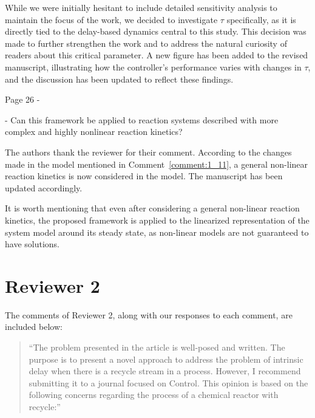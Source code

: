 \documentclass[11pt,answers]{exam}
\begin{document}
\begin{questions}
\begin{solutionorbox}
        While we were initially hesitant to include detailed sensitivity analysis to maintain the focus of the work, we decided to investigate \(\tau\) specifically, as it is directly tied to the delay-based dynamics central to this study. This decision was made to further strengthen the work and to address the natural curiosity of readers about this critical parameter. A new figure has been added to the revised manuscript, illustrating how the controller’s performance varies with changes in \(\tau\), and the discussion has been updated to reflect these findings. 
    \end{solutionorbox}


    \question Page 26 - 

    - Can this framework be applied to reaction systems described with more complex and highly nonlinear reaction kinetics?

    \begin{solutionorbox} \label{comment:1_15}
        The authors thank the reviewer for their comment. According to the changes made in the model mentioned in Comment~\ref{comment:1_11}, a general non-linear reaction kinetics is now considered in the model. The manuscript has been updated accordingly.

        It is worth mentioning that even after considering a general non-linear reaction kinetics, the proposed framework is applied to the linearized representation of the system model around its steady state, as non-linear models are not guaranteed to have solutions.
    \end{solutionorbox}


\end{questions}

\newpage

\section*{Reviewer 2}

The comments of Reviewer 2, along with our responses to each comment, are included below:

\begin{quote}
    ``The problem presented in the article is well-posed and written. The purpose is to present a novel approach to address the problem of intrinsic delay when there is a recycle stream in a process. However, I recommend submitting it to a journal focused on Control. This opinion is based on the following concerns regarding the process of a chemical reactor with recycle:''
\end{quote}
\end{document}

